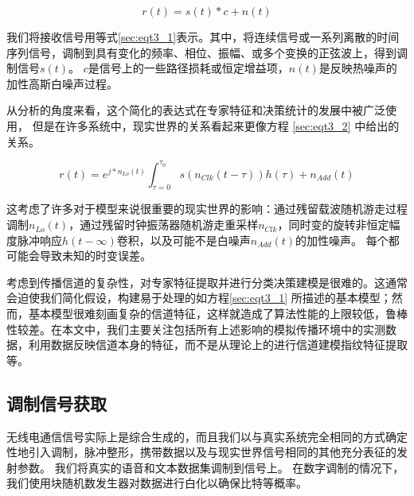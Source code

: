\begin{equation}\label{sec:eqt3_1}
r(t) = s(t)*c + n(t)
\end{equation}

我们将接收信号用等式\ref{sec:eqt3_1}表示。其中，将连续信号或一系列离散的时间序列信号，调制到具有变化的频率、相位、振幅、或多个变换的正弦波上，得到调制信号$s(t)$。
 $c$是信号上的一些路径损耗或恒定增益项，$n(t)$是反映热噪声的加性高斯白噪声过程。\par

从分析的角度来看，这个简化的表达式在专家特征和决策统计的发展中被广泛使用，
但是在许多系统中，现实世界的关系看起来更像方程 \ref{sec:eqt3_2} 中给出的关系。\par

\begin{equation}\label{sec:eqt3_2}
	r(t) = e^{j*n_{Lo}(t)} \int_{\tau=0}^{\tau_{0}} s(n_{Clk}(t-\tau))h(\tau) + n_{Add}(t)
\end{equation}

这考虑了许多对于模型来说很重要的现实世界的影响：通过残留载波随机游走过程调制$n_{Lo}(t)$，通过残留时钟振荡器随机游走重采样$n_{Clk}$，同时变的旋转非恒定幅度脉冲响应$h(t-∞)$卷积，以及可能不是白噪声$n_{Add}(t)$的加性噪声。 每个都可能会导致未知的时变误差。\par

考虑到传播信道的复杂性，对专家特征提取并进行分类决策建模是很难的。这通常会迫使我们简化假设，构建易于处理的如方程\ref{sec:eqt3_1} 所描述的基本模型；然而，基本模型很难刻画复杂的信道特征，这样就造成了算法性能的上限较低，鲁棒性较差。在本文中，我们主要关注包括所有上述影响的模拟传播环境中的实测数据，利用数据反映信道本身的特征，而不是从理论上的进行信道建模指纹特征提取等。\par



\subsection{调制信号获取}

无线电通信信号实际上是综合生成的，而且我们以与真实系统完全相同的方式确定性地引入调制，脉冲整形，携带数据以及与现实世界信号相同的其他充分表征的发射参数。 我们将真实的语音和文本数据集调制到信号上。 在数字调制的情况下，我们使用块随机数发生器对数据进行白化以确保比特等概率。\par

